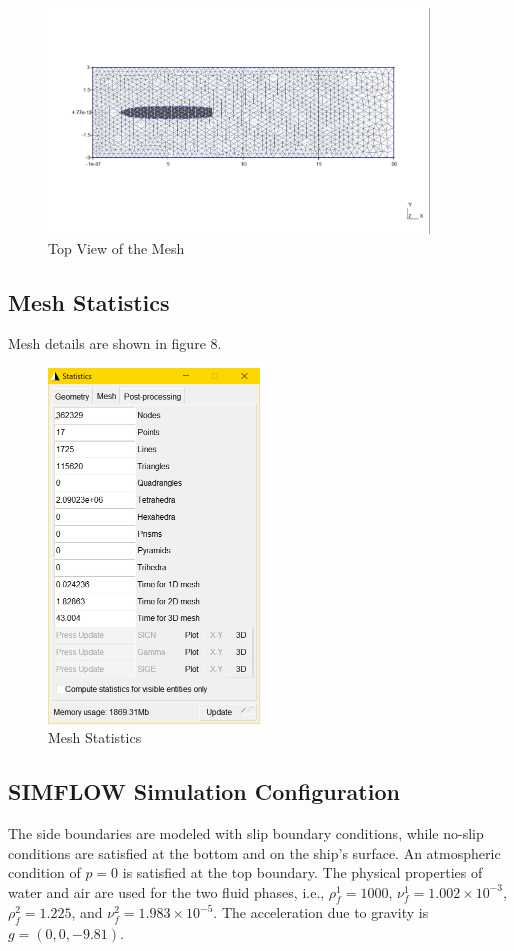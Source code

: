 \documentclass[12pt]{article} %
\begin{document}
\begin{figure}[ht]
    \centering
    \includegraphics[width=0.9\textwidth]{Mesh_4.png}
    \caption{Top View of the Mesh}
\end{figure}
\clearpage
\subsection{Mesh Statistics}
Mesh details are shown in figure 8.
\begin{figure}[ht]
    \centering
    \includegraphics[width=0.5\textwidth]{MS.png}
    \caption{Mesh Statistics}
\end{figure}
\subsection{SIMFLOW Simulation Configuration}
The side boundaries are modeled with slip boundary conditions, while no-slip conditions are satisfied at the bottom and on the ship's surface. An atmospheric condition of \( p = 0 \) is satisfied at the top boundary. The physical properties of water and air are used for the two fluid phases, i.e., \( \rho_f^1 = 1000 \), \( \nu_f^1 = 1.002 \times 10^{-3} \), \( \rho_f^2 = 1.225 \), and \( \nu_f^2 = 1.983 \times 10^{-5} \). The acceleration due to gravity is \( g = (0, 0, -9.81) \).%
\end{document}
